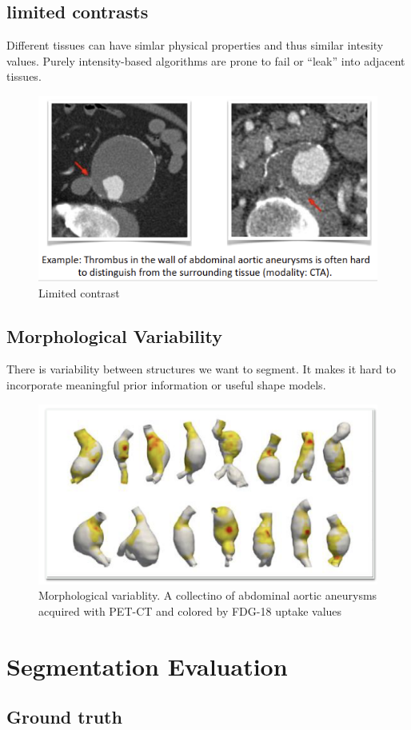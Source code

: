 \documentclass[11pt]{article}
\begin{document}
\subsection{limited contrasts}

Different tissues can have simlar physical properties and thus similar intesity values. Purely intensity-based algorithms are prone to fail or ``leak'' into adjacent tissues.

\begin{figure}[H]
    \centering
    \includegraphics[width=.4\linewidth]{figures/limited-contrast.png}
    \caption{Limited contrast}
\end{figure}

\subsection{Morphological Variability}

There is variability between structures we want to segment. It makes it hard to incorporate meaningful prior information or useful shape models.

\begin{figure}[H]
    \centering
    \includegraphics[width=.4\linewidth]{figures/morphological-variablity.png}
    \caption{Morphological variablity. A collectino of abdominal aortic aneurysms acquired with PET-CT and colored by FDG-18 uptake values}
\end{figure}

\section{Segmentation Evaluation}

\subsection{Ground truth}
\end{document}
